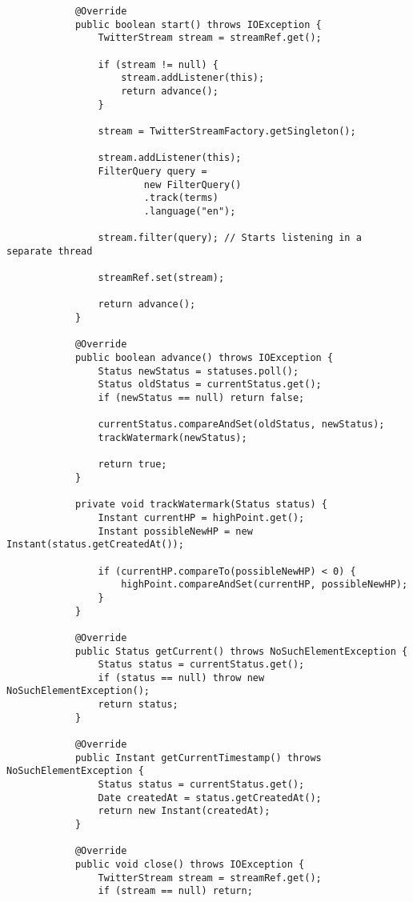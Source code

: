\begin{codelisting}
\begin{verbatim}
            @Override
            public boolean start() throws IOException {
                TwitterStream stream = streamRef.get();

                if (stream != null) {
                    stream.addListener(this);
                    return advance();
                }

                stream = TwitterStreamFactory.getSingleton();

                stream.addListener(this);
                FilterQuery query =
                        new FilterQuery()
                        .track(terms)
                        .language("en");

                stream.filter(query); // Starts listening in a separate thread

                streamRef.set(stream);

                return advance();
            }

            @Override
            public boolean advance() throws IOException {
                Status newStatus = statuses.poll();
                Status oldStatus = currentStatus.get();
                if (newStatus == null) return false;

                currentStatus.compareAndSet(oldStatus, newStatus);
                trackWatermark(newStatus);

                return true;
            }

            private void trackWatermark(Status status) {
                Instant currentHP = highPoint.get();
                Instant possibleNewHP = new Instant(status.getCreatedAt());

                if (currentHP.compareTo(possibleNewHP) < 0) {
                    highPoint.compareAndSet(currentHP, possibleNewHP);
                }
            }

            @Override
            public Status getCurrent() throws NoSuchElementException {
                Status status = currentStatus.get();
                if (status == null) throw new NoSuchElementException();
                return status;
            }

            @Override
            public Instant getCurrentTimestamp() throws NoSuchElementException {
                Status status = currentStatus.get();
                Date createdAt = status.getCreatedAt();
                return new Instant(createdAt);
            }

            @Override
            public void close() throws IOException {
                TwitterStream stream = streamRef.get();
                if (stream == null) return;


\end{verbatim}
\end{codelisting}
